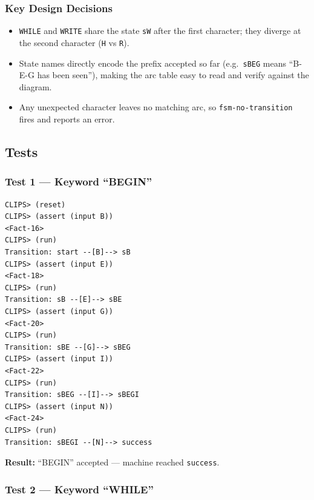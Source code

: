 \documentclass[12pt,a4paper]{article}
\begin{document}
\subsubsection*{Key Design Decisions}

\begin{itemize}
  \item \texttt{WHILE} and \texttt{WRITE} share the state \texttt{sW} after
        the first character; they diverge at the second character
        (\texttt{H} vs \texttt{R}).
  \item State names directly encode the prefix accepted so far
        (e.g.\ \texttt{sBEG} means ``B-E-G has been seen''), making the
        arc table easy to read and verify against the diagram.
  \item Any unexpected character leaves no matching arc, so
        \texttt{fsm-no-transition} fires and reports an error.
\end{itemize}

\subsection*{Tests}

\subsubsection*{Test 1 --- Keyword ``BEGIN''}

\begin{lstlisting}[style=terminalStyle]
CLIPS> (reset)
CLIPS> (assert (input B))
<Fact-16>
CLIPS> (run)
Transition: start --[B]--> sB
CLIPS> (assert (input E))
<Fact-18>
CLIPS> (run)
Transition: sB --[E]--> sBE
CLIPS> (assert (input G))
<Fact-20>
CLIPS> (run)
Transition: sBE --[G]--> sBEG
CLIPS> (assert (input I))
<Fact-22>
CLIPS> (run)
Transition: sBEG --[I]--> sBEGI
CLIPS> (assert (input N))
<Fact-24>
CLIPS> (run)
Transition: sBEGI --[N]--> success
\end{lstlisting}

\begin{successbox}
\textbf{Result:} ``BEGIN'' accepted --- machine reached \texttt{success}. \checkmark
\end{successbox}

\subsubsection*{Test 2 --- Keyword ``WHILE''}
\end{document}
